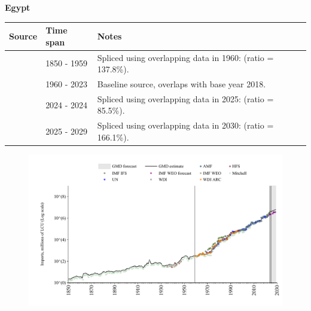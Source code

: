 \documentclass[12pt,a4paper,landscape]{article}
\begin{document}
\begin{adjustbox}{max totalsize={\paperwidth}{\paperheight},center}
\begin{minipage}[t][\textheight][t]{\textwidth}
\vspace*{0.5cm}
{}
\begin{center}
{\Large\bfseries Egypt}
\end{center}
\vspace{0.5cm}
\begin{table}[H]
\centering
\small
\begin{tabular}{|l|l|l|}
\hline
\textbf{Source} & \textbf{Time span} & \textbf{Notes} \\
\hline
\rowcolor{white}\cite{Mitchell}& 1850 - 1959 &Spliced using overlapping data in 1960: (ratio = 137.8\%).\\
\rowcolor{lightgray}\cite{WDI}& 1960 - 2023 &Baseline source, overlaps with base year 2018.\\
\rowcolor{white}\cite{IMF_IFS}& 2024 - 2024 &Spliced using overlapping data in 2025: (ratio = 85.5\%).\\
\rowcolor{lightgray}\cite{IMF_WEO_forecast}& 2025 - 2029 &Spliced using overlapping data in 2030: (ratio = 166.1\%).\\
\hline
\end{tabular}
\end{table}
\begin{figure}[H]
\centering
\includegraphics[width=\textwidth,height=0.6\textheight,keepaspectratio]{graphs/EGY_imports.pdf}
\end{figure}
\end{minipage}
\end{adjustbox}
\end{document}
